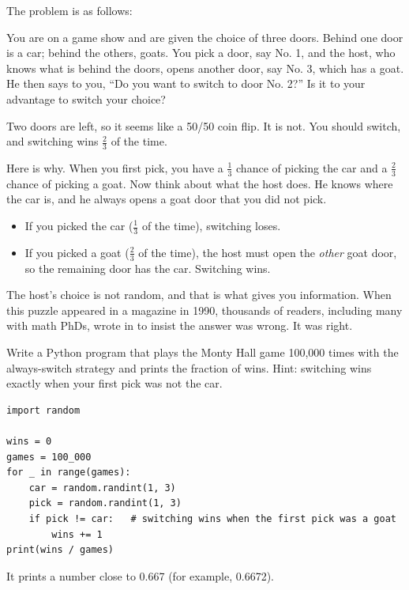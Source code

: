 The problem is as follows:
\begin{theorem}
    You are on a game show and are given the choice of three doors. Behind one door is a car; behind the others, goats. You pick a door, say No. 1, and the host, who knows what is behind the doors, opens another door, say No. 3, which has a goat. He then says to you, ``Do you want to switch to door No. 2?'' Is it to your advantage to switch your choice?
\end{theorem}

Two doors are left, so it seems like a 50/50 coin flip. It is not. You
should switch, and switching wins $\frac{2}{3}$ of the time.

Here is why. When you first pick, you have a $\frac{1}{3}$ chance of
picking the car and a $\frac{2}{3}$ chance of picking a goat. Now think
about what the host does. He knows where the car is, and he always opens a
goat door that you did not pick.
\begin{itemize}
\item If you picked the car ($\frac{1}{3}$ of the time), switching loses.
\item If you picked a goat ($\frac{2}{3}$ of the time), the host must open
      the \emph{other} goat door, so the remaining door has the car.
      Switching wins.
\end{itemize}
The host's choice is not random, and that is what gives you information.
When this puzzle appeared in a magazine in 1990, thousands of readers,
including many with math PhDs, wrote in to insist the answer was wrong. It
was right.

\begin{Exercise}[title={Let the computer play}, label=par_monty]
Write a Python program that plays the Monty Hall game 100,000 times with
the always-switch strategy and prints the fraction of wins. Hint: switching
wins exactly when your first pick was not the car.
\end{Exercise}
\begin{Answer}[ref=par_monty]
\begin{verbatim}
import random

wins = 0
games = 100_000
for _ in range(games):
    car = random.randint(1, 3)
    pick = random.randint(1, 3)
    if pick != car:   # switching wins when the first pick was a goat
        wins += 1
print(wins / games)
\end{verbatim}
It prints a number close to 0.667 (for example, 0.6672).
\end{Answer}

